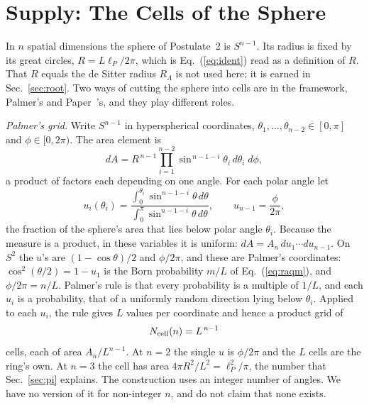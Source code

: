 \documentclass[aps,prd,twocolumn,superscriptaddress,nofootinbib]{revtex4-2}
\begin{document}
\section{Supply: The Cells of the Sphere}
\label{sec:supply}

In $n$ spatial dimensions the sphere of Postulate~2 is $S^{n-1}$. Its radius is fixed by its great circles, $R = L\ell_P/2\pi$, which is Eq.~(\ref{eq:ident}) read as a definition of $R$. That $R$ equals the de Sitter radius $R_\Lambda$ is not used here; it is earned in Sec.~\ref{sec:root}. Two ways of cutting the sphere into cells are in the framework, Palmer's and Paper~\cite{korytko2026}'s, and they play different roles.

\textit{Palmer's grid.} Write $S^{n-1}$ in hyperspherical coordinates, $\theta_1,\dots,\theta_{n-2}\in[0,\pi]$ and $\phi\in[0,2\pi)$. The area element is
\begin{equation}
dA = R^{\,n-1}\prod_{i=1}^{n-2}\sin^{\,n-1-i}\theta_i\,d\theta_i\;d\phi,
\label{eq:dA}
\end{equation}
a product of factors each depending on one angle. For each polar angle let
\begin{equation}
u_i(\theta_i) = \frac{\int_0^{\theta_i}\sin^{n-1-i}\theta\,d\theta}{\int_0^{\pi}\sin^{n-1-i}\theta\,d\theta},\qquad u_{n-1} = \frac{\phi}{2\pi},
\label{eq:u}
\end{equation}
the fraction of the sphere's area that lies below polar angle $\theta_i$. Because the measure is a product, in these variables it is uniform: $dA = A_n\,du_1\cdots du_{n-1}$. On $S^2$ the $u$'s are $(1-\cos\theta)/2$ and $\phi/2\pi$, and these are Palmer's coordinates: $\cos^2(\theta/2) = 1 - u_1$ is the Born probability $m/L$ of Eq.~(\ref{eq:raqm}), and $\phi/2\pi = n/L$. Palmer's rule is that every probability is a multiple of $1/L$, and each $u_i$ is a probability, that of a uniformly random direction lying below $\theta_i$. Applied to each $u_i$, the rule gives $L$ values per coordinate and hence a product grid of
\begin{equation}
N_{\rm cell}(n) = L^{\,n-1}
\label{eq:cells}
\end{equation}
cells, each of area $A_n/L^{n-1}$. At $n=2$ the single $u$ is $\phi/2\pi$ and the $L$ cells are the ring's own. At $n=3$ the cell has area $4\pi R^2/L^2 = \ell_P^2/\pi$, the number that Sec.~\ref{sec:pi} explains. The construction uses an integer number of angles. We have no version of it for non-integer $n$, and do not claim that none exists.
\end{document}
